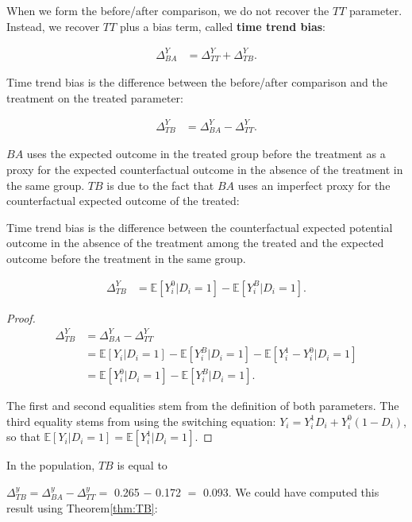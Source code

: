 \documentclass[]{book}
\newcommand{\esp}[1]{\mathbb{E}[ #1 ]}
\theoremstyle{definition}
\theoremstyle{definition}
\theoremstyle{definition}
\theoremstyle{remark}
\let\BeginKnitrBlock\begin \let\EndKnitrBlock\end
\begin{document}
When we form the before/after comparison, we do not recover the \(TT\)
parameter. Instead, we recover \(TT\) plus a bias term, called
\textbf{time trend bias}:

\begin{align*}
\Delta^Y_{BA} & =\Delta^Y_{TT}+\Delta^Y_{TB}.
\end{align*}

\BeginKnitrBlock{definition}[Time trend bias]
\protect\hypertarget{def:unnamed-chunk-26}{}{\label{def:unnamed-chunk-26}
\iffalse (Time trend bias) \fi{} }Time trend bias is the difference
between the before/after comparison and the treatment on the treated
parameter:

\begin{align*}
\Delta^Y_{TB} & = \Delta^Y_{BA}-\Delta^Y_{TT} .
\end{align*}
\EndKnitrBlock{definition}

\(BA\) uses the expected outcome in the treated group before the
treatment as a proxy for the expected counterfactual outcome in the
absence of the treatment in the same group. \(TB\) is due to the fact
that \(BA\) uses an imperfect proxy for the counterfactual expected
outcome of the treated:

\BeginKnitrBlock{theorem}
\protect\hypertarget{thm:TB}{}{\label{thm:TB} }Time trend bias is the
difference between the counterfactual expected potential outcome in the
absence of the treatment among the treated and the expected outcome
before the treatment in the same group.

\begin{align*}
\Delta^Y_{TB} & = \esp{Y_i^0|D_i=1}-\esp{Y_i^B|D_i=1}.
\end{align*}
\EndKnitrBlock{theorem}

\BeginKnitrBlock{proof}
\iffalse{} {Proof. } \fi{}

\begin{align*}
\Delta^Y_{TB} & = \Delta^Y_{BA}-\Delta^Y_{TT} \\
              & = \esp{Y_i|D_i=1}-\esp{Y^B_i|D_i=1}-\esp{Y_i^1-Y_i^0|D_i=1}\\
              & = \esp{Y_i^0|D_i=1}-\esp{Y_i^B|D_i=1}.
\end{align*}

The first and second equalities stem from the definition of both
parameters. The third equality stems from using the switching equation:
\(Y_i=Y_i^1D_i+Y_i^0(1-D_i)\), so that
\(\esp{Y_i|D_i=1}=\esp{Y^1_i|D_i=1}\).
\EndKnitrBlock{proof}

\BeginKnitrBlock{example}
\protect\hypertarget{exm:unnamed-chunk-28}{}{\label{exm:unnamed-chunk-28}
}In the population, \(TB\) is equal to
\EndKnitrBlock{example} \(\Delta^y_{TB}=\Delta^y_{BA}-\Delta^y_{TT}=\)
0.265 \(-\) 0.172 \(=\) 0.093. We could have computed this result using
Theorem\ref{thm:TB}:
\end{document}
